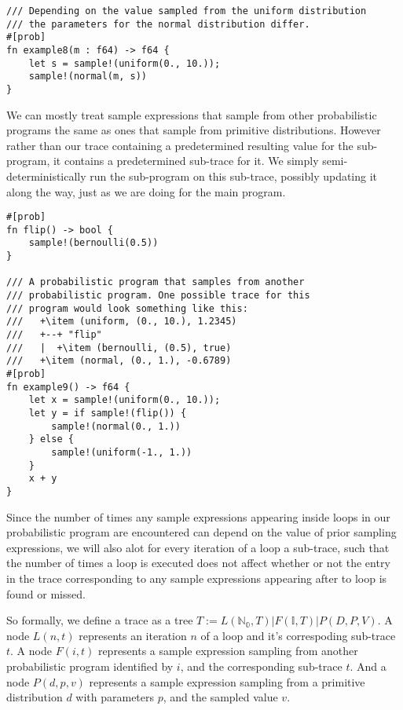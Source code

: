 \begin{minipage}{\linewidth}
\begin{lstlisting}
/// Depending on the value sampled from the uniform distribution
/// the parameters for the normal distribution differ.
#[prob]
fn example8(m : f64) -> f64 {
    let s = sample!(uniform(0., 10.));
    sample!(normal(m, s))
}
\end{lstlisting}
\end{minipage}

We can mostly treat sample expressions that sample from other probabilistic programs the same as ones that sample from primitive distributions. However rather than our trace containing a predetermined resulting value for the sub-program, it contains a predetermined sub-trace for it. We simply semi-deterministically run the sub-program on this sub-trace, possibly updating it along the way, just as we are doing for the main program.

\begin{minipage}{\linewidth}
\begin{lstlisting}
#[prob]
fn flip() -> bool {
    sample!(bernoulli(0.5))
}

/// A probabilistic program that samples from another 
/// probabilistic program. One possible trace for this
/// program would look something like this:
///   +\item (uniform, (0., 10.), 1.2345)
///   +--+ "flip"
///   |  +\item (bernoulli, (0.5), true)
///   +\item (normal, (0., 1.), -0.6789)
#[prob]
fn example9() -> f64 {
    let x = sample!(uniform(0., 10.));
    let y = if sample!(flip()) {
        sample!(normal(0., 1.))
    } else {
        sample!(uniform(-1., 1.))
    }
    x + y
}
\end{lstlisting}
\end{minipage}

Since the number of times any sample expressions appearing inside loops in our probabilistic program are encountered can depend on the value of prior sampling expressions, we will also alot for every iteration of a loop a sub-trace, such that the number of times a loop is executed does not affect whether or not the entry in the trace corresponding to any sample expressions appearing after to loop is found or missed.

So formally, we define a trace as a tree $T := L(\mathbb{N_0}, T) | F(\mathbb{I}, T) | P(D,P,V)$. A node $L(n,t)$ represents an iteration $n$ of a loop and it's correspoding sub-trace $t$. A node $F(i, t)$ represents a sample expression sampling from another probabilistic program identified by $i$, and the corresponding sub-trace $t$. And a node $P(d,p,v)$ represents a sample expression sampling from a primitive distribution $d$ with parameters $p$, and the sampled value $v$.

